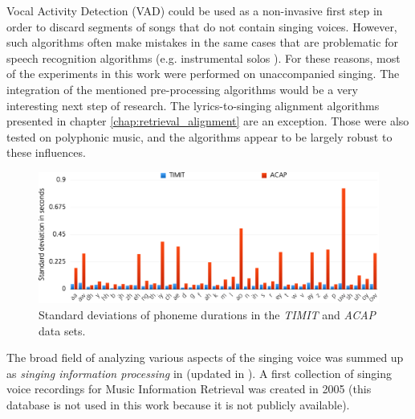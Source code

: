\begin{description}
 Vocal Activity Detection (VAD) could be used as a non-invasive first step in order to discard segments of songs that do not contain singing voices. However, such algorithms often make mistakes in the same cases that are problematic for speech recognition algorithms (e.g. instrumental solos \cite{schlueter2016_ismir}).
 For these reasons, most of the experiments in this work were performed on unaccompanied singing. The integration of the mentioned pre-processing algorithms would be a very interesting next step of research.
The lyrics-to-singing alignment algorithms presented in chapter \ref{chap:retrieval_alignment} are an exception. Those were also tested on polyphonic music, and the algorithms appear to be largely robust to these influences.
 \end{description}
 

\begin{figure}
	\begin{center}
		\includegraphics[width=1\textwidth]{images/phoneme_stats.png}
		\caption{Standard deviations of phoneme durations in the \textit{TIMIT} and \textit{ACAP} data sets.}
		\label{fig:phoneme_stats}
	\end{center}
\end{figure}

The broad field of analyzing various aspects of the singing voice was summed up as \textit{singing information processing} in \cite{singing_information_processing} (updated in \cite{singing_information_processing2}). A first collection of singing voice recordings for Music Information Retrieval was created in 2005 \cite{jap_humming} (this database is not used in this work because it is not publicly available).


